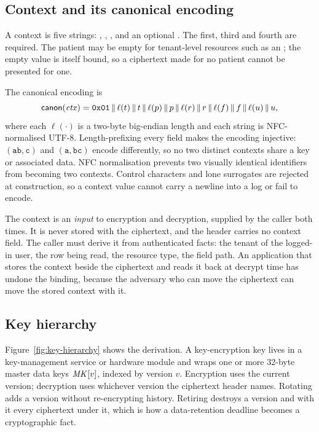 \subsection{Context and its canonical encoding}
\label{sec:context}

A context is five strings: , , ,  and an optional . The first, third and fourth are required. The patient may be empty for tenant-level resources such as an ; the empty value is itself bound, so a ciphertext made for no patient cannot be presented for one.

The canonical encoding is
\[
\mathsf{canon}(\mathit{ctx}) = \mathtt{0x01} \,\|\, \ell(t)\,\|\, t \,\|\, \ell(p)\,\|\, p \,\|\, \ell(r)\,\|\, r \,\|\, \ell(f)\,\|\, f \,\|\, \ell(u)\,\|\, u,
\]
where each $\ell(\cdot)$ is a two-byte big-endian length and each string is NFC-normalised UTF-8. Length-prefixing every field makes the encoding injective: $(\mathtt{ab}, \mathtt{c})$ and $(\mathtt{a}, \mathtt{bc})$ encode differently, so no two distinct contexts share a key or associated data. NFC normalisation prevents two visually identical identifiers from becoming two contexts. Control characters and lone surrogates are rejected at construction, so a context value cannot carry a newline into a log or fail to encode.

The context is an \emph{input} to encryption and decryption, supplied by the caller both times. It is never stored with the ciphertext, and the header carries no context field. The caller must derive it from authenticated facts: the tenant of the logged-in user, the row being read, the resource type, the field path. An application that stores the context beside the ciphertext and reads it back at decrypt time has undone the binding, because the adversary who can move the ciphertext can move the stored context with it.

\subsection{Key hierarchy}
\label{sec:keys}

Figure~\ref{fig:key-hierarchy} shows the derivation. A key-encryption key lives in a key-management service or hardware module and wraps one or more 32-byte master data keys $\mathit{MK}[v]$, indexed by version $v$. Encryption uses the current version; decryption uses whichever version the ciphertext header names. Rotating adds a version without re-encrypting history. Retiring destroys a version and with it every ciphertext under it, which is how a data-retention deadline becomes a cryptographic fact.

